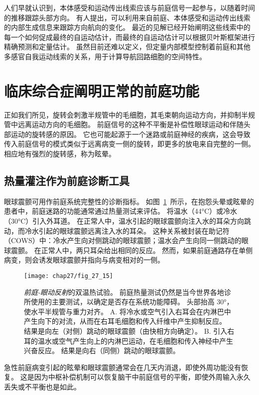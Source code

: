 人们早就认识到，本体感受和运动传出线索应该与前庭信号一起参与，以随着时间的推移跟踪头部方向。
有人提出，可以利用来自前庭、本体感受和运动传出线索的内部生成信息来跟踪方向航向的变化。
最近的见解已经开始阐明这些线索中的每一个如何促成最终的自运动估计，而最终的自运动估计可以根据贝叶斯框架进行精确预测和定量估计。
虽然目前还难以定义，但定量内部模型控制着前庭和其他多感官自我运动线索的关系，用于计算导航回路细胞的空间特性。




\section{临床综合症阐明正常的前庭功能}

正如我们所见，旋转会刺激半规管中的毛细胞，其毛束朝向运动方向，并抑制半规管中远离运动方向的毛细胞。
前庭信号的这种不平衡是补偿性眼球运动和伴随头部运动的旋转感的原因。
它也可能起源于一个迷路或前庭神经的疾病，这会导致传入前庭信号的模式类似于远离病变一侧的旋转，即更多的放电来自完整的一侧。
相应地有强烈的旋转感，称为眩晕。



\subsection{热量灌注作为前庭诊断工具}

眼球震颤可用作前庭系统完整性的诊断指标。
如图~\ref{fig:27_15}~所示，在抱怨头晕或眩晕的患者中，前庭迷路的功能通常通过热量测试来评估。
将温水（44°C）或冷水（30°C）引入外耳道。
在正常人中，温水引起的眼球震颤向注入水的耳朵方向跳动，而冷水引起的眼球震颤远离注入水的耳朵。
这种关系被封装在助记符（COWS）中：冷水产生向对侧跳动的眼球震颤；温水会产生向同一侧跳动的眼球震颤。
在正常人中，两只耳朵给出相同的反应。
然而，如果前庭通路存在单侧病变，则会诱发眼球震颤并指向与病变相对的一侧。


\begin{figure}[htbp]
	\centering
	\texttt{[image: chap27/fig\_27\_15]}
	\caption{\textit{前庭-眼动反射}的双温热试验。
		前庭热量测试仍然是当今世界各地诊所使用的主要测试，以确定是否存在系统功能障碍。
		头部抬高 30°，使水平半规管与重力对齐。
		A. 将冷水或空气引入右耳会在内淋巴中产生向下的对流，从而在右耳毛细胞和传入纤维中产生抑制反应。
		结果是向左（对侧）跳动的眼球震颤（由快相方向确定）。
		B. 引入右耳的温水或空气产生向上的内淋巴运动，在毛细胞和传入神经中产生兴奋反应。
		结果是向右（同侧）跳动的眼球震颤。}
	\label{fig:27_15}
\end{figure}


急性前庭病变引起的眩晕和眼球震颤通常会在几天内消退，即使外周功能没有恢复。
这是因为中枢补偿机制可以恢复脑干中前庭信号的平衡，即使外周输入永久丢失或不平衡也是如此。


